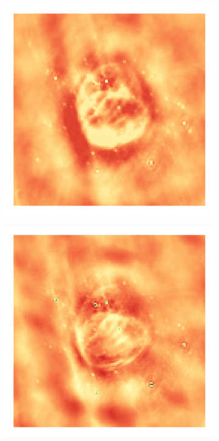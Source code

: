 \begin{figure}[h]
	\begin{subfigure}[b]{0.3\linewidth}
		\includegraphics[width=\linewidth, trim={18px 19px 18px 18px}, clip]{./chapters/05.results/g55/clean_residual.png}
	\end{subfigure}
	\begin{subfigure}[b]{0.3\linewidth}
		\includegraphics[width=\linewidth, trim={18px 19px 18px 18px}, clip]{./chapters/05.results/g55/L2_residual.png}

\end{subfigure}
\end{figure}
